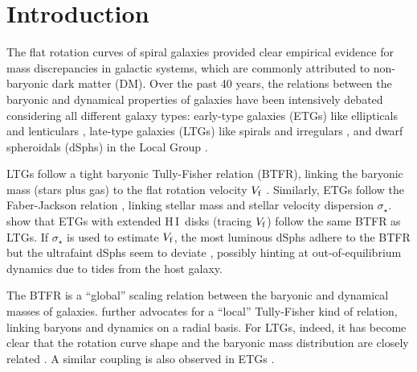 \documentclass[apjl, twocolappendix]{emulateapj}
\newcommand{\hi } {{\rm H}\,{\small\rm I} \,}
\begin{document}

\section{Introduction}\label{sec:intro}

The flat rotation curves of spiral galaxies \citep{Bosma1978, Rubin1978} provided clear empirical evidence for mass discrepancies in galactic systems, which are commonly attributed to non-baryonic dark matter (DM). Over the past 40 years, the relations between the baryonic and dynamical properties of galaxies have been intensively debated considering all different galaxy types: early-type galaxies (ETGs) like ellipticals and lenticulars \citep[e.g.,][]{Faber1976, Djorgovski1987, Dressler1987, Cappellari2016}, late-type galaxies (LTGs) like spirals and irregulars \citep[e.g.,][]{Rubin1985, vanAlbada1986, Persic1991, vanderKruit2011}, and dwarf spheroidals (dSphs) in the Local Group \citep[e.g.,][]{Mateo1998, Battaglia2008, Strigari2008, 2009ApJ...704.1274W}.

LTGs follow a tight baryonic Tully-Fisher \citep{Tully1977} relation (BTFR), linking the baryonic mass (stars plus gas) to the flat rotation velocity $V_{\rm f}$ \citep[e.g.,][]{McGaugh2000, Verheijen2001b, Lelli2016}. Similarly, ETGs follow the Faber-Jackson relation \citep{Faber1976}, linking stellar mass and stellar velocity dispersion $\sigma_{\star}$. \citet{denHeijer2015} show that ETGs with extended \hi disks (tracing $V_{\rm f}$) follow the same BTFR as LTGs. If $\sigma_{\star}$ is used to estimate $V_{\rm f}$, the most luminous dSphs adhere to the BTFR but the ultrafaint dSphs seem to deviate \citep{McGaugh2010}, possibly hinting at out-of-equilibrium dynamics due to tides from the host galaxy.

The BTFR is a ``global'' scaling relation between the baryonic and dynamical masses of galaxies. \citet{Sancisi2004} further advocates for a ``local'' Tully-Fisher kind of relation, linking baryons and dynamics on a radial basis. For LTGs, indeed, it has become clear that the rotation curve shape and the baryonic mass distribution are closely related \citep{Kent1987, Corradi1990, Casertano1991, Sancisi2004, McGaugh2004, McGaugh2005, Noordermeer2007a, Swaters2009, Swaters2012, Swaters2014, Lelli2010, Lelli2013, Lelli2016}. A similar coupling is also observed in ETGs \citep{Serra2016}.
\end{document}

